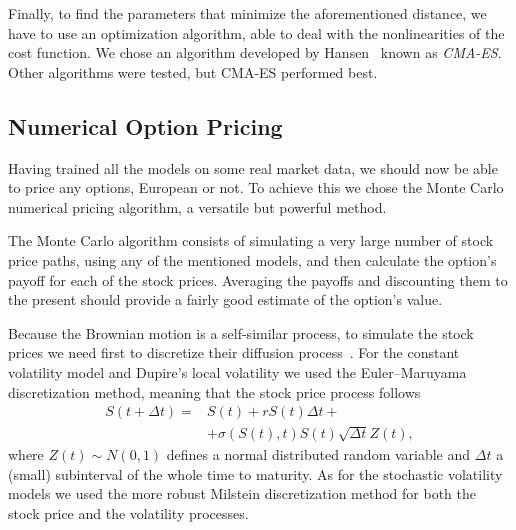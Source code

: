 Finally, to find the parameters that minimize the aforementioned distance, we have to use an optimization algorithm, able to deal with the nonlinearities of the cost function.
We chose an algorithm developed by Hansen~\citep{Hansen2} known as \emph{CMA-ES}. Other algorithms were tested, but CMA-ES performed best.

\subsection{Numerical Option Pricing}
Having trained all the models on some real market data, we should now be able to price any options, European or not. To achieve this we chose the Monte Carlo numerical pricing algorithm, a versatile but powerful method.

The Monte Carlo algorithm consists of simulating a very large number of stock price paths, using any of the mentioned models, and then calculate the option's payoff for each of the stock prices. Averaging the payoffs and discounting them to the present should provide a fairly good estimate of the option's value.

Because the Brownian motion is a self-similar process, to simulate the stock prices we need first to discretize their diffusion process~\citep{Mikosch}. For the constant volatility model and Dupire's local volatility we used the Euler–Maruyama discretization method, meaning that the stock price process follows
\begin{equation}
\begin{split}
S(t+\Delta t)=&S(t)+rS(t)\Delta t+\\
&+\sigma(S(t),t)S(t)\sqrt{\Delta t}Z(t),
\end{split}
\end{equation}
\noindent where $Z(t)\sim N(0,1)$ defines a normal distributed random variable and $\Delta t$ a (small) subinterval of the whole time to maturity.
As for the stochastic volatility models we used the more robust Milstein discretization method for both the stock price and the volatility processes.

